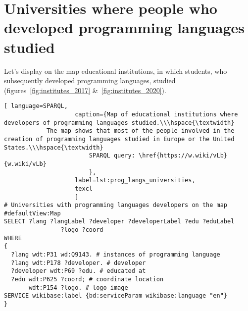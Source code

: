 \section{Universities where people who developed programming languages studied}
Let's display on the map educational institutions, in which students, who subsequently developed programming languages, studied (figures~\ref{fig:institutes_2017} \&~\ref{fig:institutes_2020}).
\begin{lstlisting}[ language=SPARQL, 
                    caption={Map of educational institutions where developers of programming languages studied.\\\hspace{\textwidth}
			The map shows that most of the people involved in the creation of programming languages studied in Europe or the United States.\\\hspace{\textwidth}
                        SPARQL query: \href{https://w.wiki/vLb}{w.wiki/vLb}
                        },
                    label=lst:prog_langs_universities,
                    texcl 
                    ]
# Universities with programming languages developers on the map
#defaultView:Map
SELECT ?lang ?langLabel ?developer ?developerLabel ?edu ?eduLabel 
				?logo ?coord
WHERE
{
  ?lang wdt:P31 wd:Q9143. # instances of programming language
  ?lang wdt:P178 ?developer. # developer
  ?developer wdt:P69 ?edu. # educated at
  ?edu wdt:P625 ?coord; # coordinate location
       wdt:P154 ?logo. # logo image
SERVICE wikibase:label {bd:serviceParam wikibase:language "en"} 	
}
\end{lstlisting}%

\label{question:prog_lang_3}

